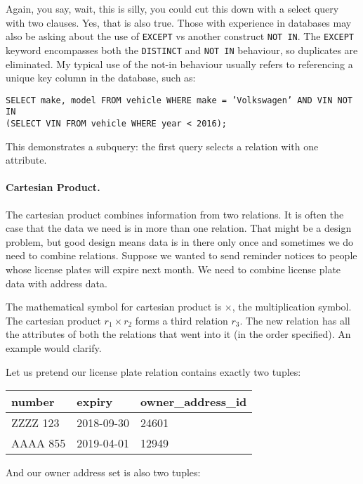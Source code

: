 \documentclass[a4paper]{report}
\begin{document}
Again, you say, wait, this is silly, you could cut this down with a select query with two clauses. Yes, that is also true. Those with experience in databases may also be asking about the use of \texttt{EXCEPT} vs another construct \texttt{NOT IN}. The \texttt{EXCEPT} keyword encompasses both the \texttt{DISTINCT} and \texttt{NOT IN} behaviour, so duplicates are eliminated. My typical use of the not-in behaviour usually refers to referencing a unique key column in the database, such as:

\texttt{SELECT make, model FROM vehicle WHERE make = 'Volkswagen' AND 
VIN NOT IN\\ (SELECT VIN FROM vehicle WHERE year < 2016);}

This demonstrates a subquery: the first query selects a relation with one attribute.  

\paragraph{Cartesian Product.} The cartesian product combines information from two relations. It is often the case that the data we need is in more than one relation. That might be a design problem, but good design means data is in there only once and sometimes we do need to combine relations. Suppose we wanted to send reminder notices to people whose license plates will expire next month. We need to combine license plate data with address data. 

The mathematical symbol for cartesian product is $\times$, the multiplication symbol. The cartesian product $r_{1} \times r_{2}$ forms a third relation $r_{3}$. The new relation has all the attributes of both the relations that went into it (in the order specified). An example would clarify.

Let us pretend our license plate relation contains exactly two tuples:

\begin{center}
\begin{tabular}{|l|l|l|}\hline
	\textbf{number} & \textbf{expiry} & \textbf{owner\_address\_id} \\ \hline
	ZZZZ 123 & 2018-09-30 & 24601 \\ \hline
	AAAA 855 & 2019-04-01 & 12949 \\ \hline
\end{tabular}
\end{center}

And our owner address set is also two tuples: 
\end{document}
